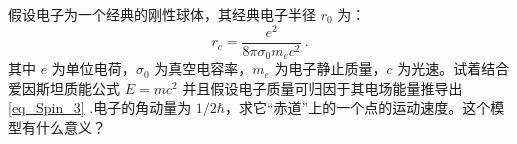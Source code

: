 
\begin{exercise}{}
假设电子为一个经典的刚性球体，其经典电子半径 $r_0$ 为：
\begin{equation}\label{eq_Spin_3}
r_c=\frac{e^2}{8\pi\sigma_0m_e c^2}~.
\end{equation}
其中 $e$ 为单位电荷，$\sigma_0$ 为真空电容率，$m_e$ 为电子静止质量，$c$ 为光速。试着结合爱因斯坦质能公式 $E=mc^2$ 并且假设电子质量可归因于其电场能量推导出\autoref{eq_Spin_3} .电子的角动量为 $1/2\hbar$，求它“赤道”上的一个点的运动速度。这个模型有什么意义？
\end{exercise}
